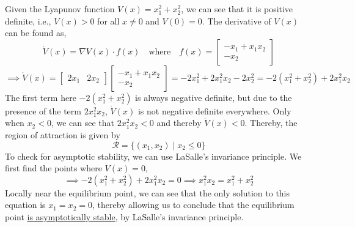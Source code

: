 Given the Lyapunov function \( V(x) = x_{1}^{2} + x_{2}^{2} \), we can see that it is positive definite, i.e., \( V(x) > 0 \) for all \( x \neq 0 \) and \( V(0) = 0 \).
The derivative of \( V(x) \) can be found as,
\[
    \dot{V}(x) = \nabla V(x) \cdot f(x)
    \quad \text{where} \quad
    f(x) = \begin{bmatrix} -x_{1} + x_{1} x_{2} \\ -x_{2} \end{bmatrix}
\]
\[
    \implies
    \dot{V}(x) = \begin{bmatrix} 2x_{1} & 2x_{2} \end{bmatrix}
    \begin{bmatrix} -x_{1} + x_{1} x_{2} \\ -x_{2} \end{bmatrix}
    = -2x_{1}^{2} + 2x_{1}^{2} x_{2} - 2x_{2}^{2}
    = -2(x_{1}^{2} + x_{2}^{2}) + 2x_{1}^{2} x_{2}
\]
The first term here \( -2(x_{1}^{2} + x_{2}^{2}) \) is always negative definite, but due to the presence of the term \( 2x_{1}^{2} x_{2} \), \( \dot{V}(x) \) is not negative definite everywhere.
Only when \( x_{2} < 0 \), we can see that \( 2x_{1}^{2} x_{2} < 0 \) and thereby \( \dot{V}(x) < 0 \).
Thereby, the region of attraction is given by
\[
    \boxed{
        \mathcal{R} = \{ (x_1, x_2) \mid x_2 \leq 0 \}
    }
\]
To check for asymptotic stability, we can use LaSalle's invariance principle.
We first find the points where \( \dot{V}(x) = 0 \),
\[
    \implies
    -2(x_{1}^{2} + x_{2}^{2}) + 2x_{1}^{2} x_{2} = 0
    \implies
    x_{1}^{2} x_{2} = x_{1}^{2} + x_{2}^{2}
\]
Locally near the equilibrium point, we can see that the only solution to this equation is \( x_{1} = x_{2} = 0 \), thereby allowing us to conclude that the equilibrium point \underline{is asymptotically stable}, by LaSalle's invariance principle.
